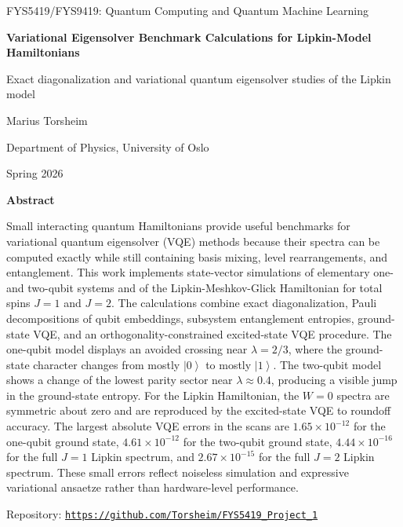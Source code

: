 \documentclass[10pt,a4paper]{article}
\newcommand{\ket}[1]{\left|#1\right\rangle}
\begin{document}
\thispagestyle{empty}
\vspace*{1.0cm}
\begin{center}
{\large FYS5419/FYS9419: Quantum Computing and Quantum Machine Learning\par}
\vspace{0.65cm}
{\LARGE\bfseries Variational Eigensolver Benchmark Calculations for Lipkin-Model Hamiltonians\par}
\vspace{0.25cm}
{\large Exact diagonalization and variational quantum eigensolver studies of the Lipkin model\par}
\vspace{0.65cm}
{\large Marius Torsheim\par}
{\large Department of Physics, University of Oslo\par}
{\large Spring 2026\par}
\vspace{0.55cm}
{\large\bfseries Abstract\par}
\end{center}
\noindent
Small interacting quantum Hamiltonians provide useful benchmarks for variational quantum eigensolver (VQE) methods because their spectra can be computed exactly while still containing basis mixing, level rearrangements, and entanglement. This work implements state-vector simulations of elementary one- and two-qubit systems and of the Lipkin-Meshkov-Glick Hamiltonian for total spins $J=1$ and $J=2$. The calculations combine exact diagonalization, Pauli decompositions of qubit embeddings, subsystem entanglement entropies, ground-state VQE, and an orthogonality-constrained excited-state VQE procedure. The one-qubit model displays an avoided crossing near $\lambda=2/3$, where the ground-state character changes from mostly $\ket{0}$ to mostly $\ket{1}$. The two-qubit model shows a change of the lowest parity sector near $\lambda\approx0.4$, producing a visible jump in the ground-state entropy. For the Lipkin Hamiltonian, the $W=0$ spectra are symmetric about zero and are reproduced by the excited-state VQE to roundoff accuracy. The largest absolute VQE errors in the scans are $1.65\times10^{-12}$ for the one-qubit ground state, $4.61\times10^{-12}$ for the two-qubit ground state, $4.44\times10^{-16}$ for the full $J=1$ Lipkin spectrum, and $2.67\times10^{-15}$ for the full $J=2$ Lipkin spectrum. These small errors reflect noiseless simulation and expressive variational ansaetze rather than hardware-level performance.

\vfill
\begin{center}
Repository: \href{https://github.com/Torsheim/FYS5419_Project_1}{\texttt{https://github.com/Torsheim/FYS5419\_Project\_1}}
\end{center}
\clearpage
{}
\setcounter{page}{1}
\twocolumn
\end{document}
